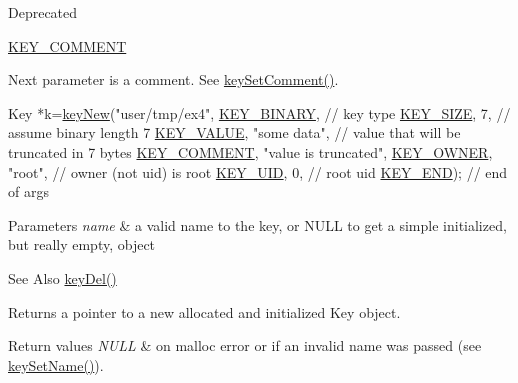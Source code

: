 \begin{DoxyRefDesc}{Deprecated}
\begin{DoxyItemize}
\item \hyperlink{group__key_gga91fb3178848bd682000958089abbaf40ac29427bb47cc31689d02912e36161ee3}{K\-E\-Y\-\_\-\-C\-O\-M\-M\-E\-N\-T} \par
 Next parameter is a comment. See \hyperlink{group__meta_ga8863a877a84fa46e6017fe72e49b89c1}{key\-Set\-Comment()}. 
\begin{DoxyCodeInclude}
Key *k=\hyperlink{group__key_gad23c65b44bf48d773759e1f9a4d43b89}{keyNew}(\textcolor{stringliteral}{"user/tmp/ex4"},
        \hyperlink{group__key_gga91fb3178848bd682000958089abbaf40a1ca18d4e094ae7487d35ecedda2235ff}{KEY\_BINARY},                   \textcolor{comment}{// key type}
        \hyperlink{group__key_gga91fb3178848bd682000958089abbaf40a6d531b5c41445d19d0452eebdccbfa01}{KEY\_SIZE}, 7,                    \textcolor{comment}{// assume binary length 7}
        \hyperlink{group__key_gga91fb3178848bd682000958089abbaf40ac66e4a49d09212b79f5754ca6db5bd2e}{KEY\_VALUE}, \textcolor{stringliteral}{"some data"},                \textcolor{comment}{// value that will be
       truncated in 7 bytes}
        \hyperlink{group__key_gga91fb3178848bd682000958089abbaf40ac29427bb47cc31689d02912e36161ee3}{KEY\_COMMENT}, \textcolor{stringliteral}{"value is truncated"},
        \hyperlink{group__key_gga91fb3178848bd682000958089abbaf40a77ca60362fa8daca8d5347db4385068b}{KEY\_OWNER}, \textcolor{stringliteral}{"root"},             \textcolor{comment}{// owner (not uid) is root}
        \hyperlink{group__key_gga91fb3178848bd682000958089abbaf40a28f01a87d65f065172f734c9c9446c0e}{KEY\_UID}, 0,                      \textcolor{comment}{// root uid}
        \hyperlink{group__key_gga91fb3178848bd682000958089abbaf40aa8adb6fcb92dec58fb19410eacfdd403}{KEY\_END});                        \textcolor{comment}{// end of args}
\end{DoxyCodeInclude}

\end{DoxyItemize}\end{DoxyRefDesc}



\begin{DoxyParams}{Parameters}
{\em name} & a valid name to the key, or N\-U\-L\-L to get a simple initialized, but really empty, object \\
\hline
\end{DoxyParams}
\begin{DoxySeeAlso}{See Also}
\hyperlink{group__key_ga3df95bbc2494e3e6703ece5639be5bb1}{key\-Del()} 
\end{DoxySeeAlso}
\begin{DoxyReturn}{Returns}
a pointer to a new allocated and initialized Key object. 
\end{DoxyReturn}

\begin{DoxyRetVals}{Return values}
{\em N\-U\-L\-L} & on malloc error or if an invalid {\ttfamily name} was passed (see \hyperlink{group__keyname_ga7699091610e7f3f43d2949514a4b35d9}{key\-Set\-Name()}). \\
\hline
\end{DoxyRetVals}
